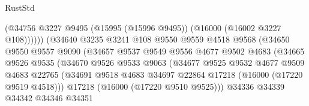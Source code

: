 \begin{lexlean}{RustStd}
\begin{coremodule}
                                        (@34756
                                          @3227
                                          @9495
                                          (@15995 (@15996 @9495))
                                          (@16000 (@16002 @3227 @108))))))
                                  (@34640
                                    @3235
                                    @3241
                                    @108
                                    @9550
                                    @9559
                                    @4518
                                    @9568
                                    (@34650
                                      @9550
                                      @9557
                                      @9090
                                      (@34657
                                        @9537
                                        @9549
                                        @9556
                                        @4677
                                        @9502
                                        @4683
                                        (@34665
                                          @9526
                                          @9535
                                          (@34670
                                            @9526
                                            @9533
                                            @9063
                                            (@34677
                                              @9525
                                              @9532
                                              @4677
                                              @9509
                                              @4683
                                              @22765
                                              (@34691
                                                @9518
                                                @4683
                                                @34697
                                                @22864
                                                @17218
                                                (@16000 (@17220 @9519 @4518)))
                                              @17218
                                              (@16000 (@17220 @9510 @9525)))
                                            @34336
                                            @34339
                                            @34342
                                            @34346
                                            @34351

\end{coremodule}
\end{lexlean}

